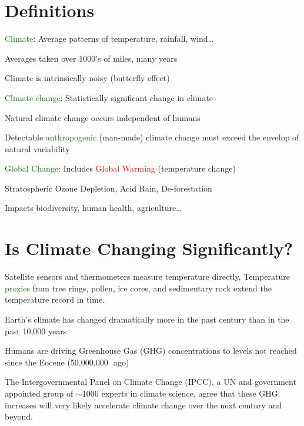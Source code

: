 \documentclass[12pt]{article}
\begin{document}
\section{Definitions}
\begin{itemize*}
\item \textcolor{green}{Climate}: Average patterns of
  temperature, rainfall, wind\ldots 
\begin{itemize*}
\item Averages taken over 1000's of miles, many years
\item Climate is intrinsically noisy (butterfly effect)
\end{itemize*}
\item \textcolor{green}{Climate change}: Statistically significant change in climate
\begin{itemize*}
\item Natural climate change occurs independent of humans
\item Detectable \textcolor{green}{anthropogenic} (man-made)
  climate change must exceed the envelop of natural variability 
\end{itemize*}
\item \textcolor{green}{Global Change}: Includes
  \textcolor{red}{Global Warming} (temperature change)
\begin{itemize*}
\item Stratospheric Ozone Depletion, Acid Rain, De-forestation 
\item Impacts biodiversity, human health, agriculture\ldots
\end{itemize*}
\end{itemize*}

\section{Is Climate Changing Significantly?}
Satellite sensors and thermometers measure temperature directly.
Temperature \textcolor{green}{proxies} from tree rings, pollen,
ice cores, and sedimentary rock extend the temperature record in time.
\begin{itemize*}
\item Earth's climate has changed dramatically more in the past
  century than in the past 10,000 years  
\item Humans are driving Greenhouse Gas (GHG) concentrations to levels
  not reached since the Eocene (50,000,000\,\yr\ ago)
\end{itemize*} 
The Intergovernmental Panel on Climate Change (IPCC), a UN and
government appointed group of $\sim 1000$ experts in climate science,
agree that these GHG increases will very likely accelerate climate
change over the next century and beyond.
\end{document}

